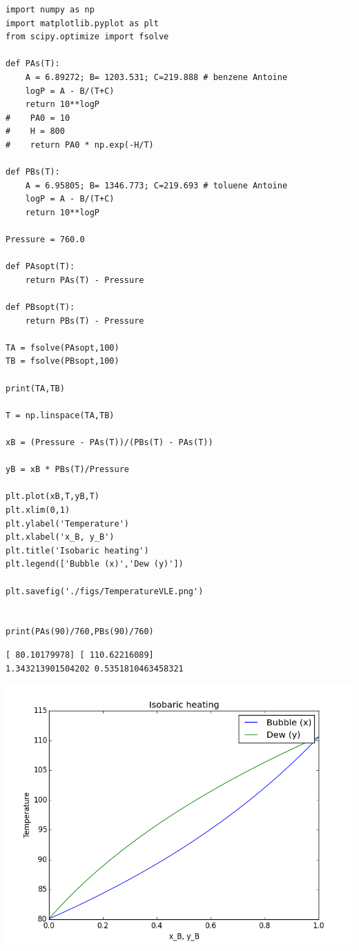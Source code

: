 \documentclass[11pt]{article}
\begin{document}
\begin{verbatim}
import numpy as np
import matplotlib.pyplot as plt
from scipy.optimize import fsolve

def PAs(T):
    A = 6.89272; B= 1203.531; C=219.888 # benzene Antoine
    logP = A - B/(T+C)
    return 10**logP
#    PA0 = 10
#    H = 800
#    return PA0 * np.exp(-H/T)

def PBs(T):
    A = 6.95805; B= 1346.773; C=219.693 # toluene Antoine
    logP = A - B/(T+C)
    return 10**logP

Pressure = 760.0

def PAsopt(T):
    return PAs(T) - Pressure

def PBsopt(T):
    return PBs(T) - Pressure

TA = fsolve(PAsopt,100)
TB = fsolve(PBsopt,100)

print(TA,TB)

T = np.linspace(TA,TB)

xB = (Pressure - PAs(T))/(PBs(T) - PAs(T))

yB = xB * PBs(T)/Pressure

plt.plot(xB,T,yB,T)
plt.xlim(0,1)
plt.ylabel('Temperature')
plt.xlabel('x_B, y_B')
plt.title('Isobaric heating')
plt.legend(['Bubble (x)','Dew (y)'])

plt.savefig('./figs/TemperatureVLE.png')


print(PAs(90)/760,PBs(90)/760)
\end{verbatim}

\begin{verbatim}
[ 80.10179978] [ 110.62216089]
1.343213901504202 0.5351810463458321
\end{verbatim}

\includegraphics[width=.9\linewidth]{./figs/TemperatureVLE.png}
\end{document}
